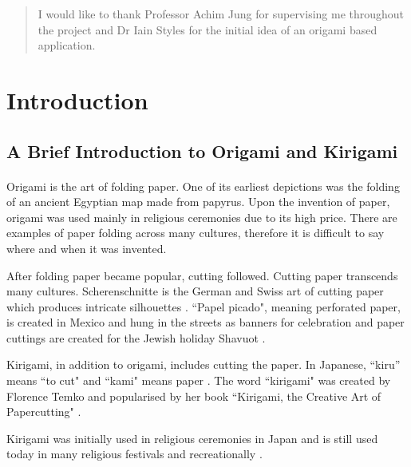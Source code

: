 \documentclass[11pt]{article}
\begin{document}
\vspace{50pt}
\renewcommand{\abstractname}{Acknowledgements}
\begin{abstract}
    I would like to thank Professor Achim Jung for supervising me throughout the project and Dr Iain Styles for the initial idea of an origami based application. 
\end{abstract}

\newpage

\section{Introduction}

        \subsection{A Brief Introduction to Origami and Kirigami}
        
            \paragraph{}
            Origami is the art of folding paper. One of its earliest depictions was the folding of an ancient Egyptian map made from papyrus. Upon the invention of paper, origami was used mainly in religious ceremonies due to its high price. There are examples of paper folding across many cultures, therefore it is difficult to say where and when it was invented.\cite{origamiBible}
            
            After folding paper became popular, cutting followed. Cutting paper transcends many cultures. Scherenschnitte is the German and Swiss art of cutting paper which produces intricate silhouettes \cite{Scherenschnitt}. ``Papel picado", meaning perforated paper, is created in Mexico and hung in the streets as banners for celebration \cite{GlobalPaperCutting} and paper cuttings are created for the Jewish holiday Shavuot \cite{CJNews}.
            
            Kirigami, in addition to origami, includes cutting the paper. In Japanese, ``kiru'' means ``to cut" \cite{Temko2004kirigami} and ``kami" means paper \cite{WordHippo}. The word ``kirigami" was created by Florence Temko and popularised by her book ``Kirigami, the Creative Art of Papercutting" \cite{OrigamiResourceCenter}.
            
            Kirigami was initially used in religious ceremonies in Japan and is still used today in many religious festivals and recreationally \cite{kyuhoshiInfo}.
           
\end{document}
